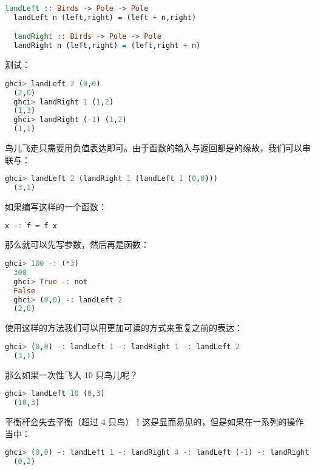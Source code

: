 \documentclass[./main.tex]{subfiles}
\begin{document}
\begin{lstlisting}[language=Haskell]
  landLeft :: Birds -> Pole -> Pole
  landLeft n (left,right) = (left + n,right)

  landRight :: Birds -> Pole -> Pole
  landRight n (left,right) = (left,right + n)
\end{lstlisting}

测试：

\begin{lstlisting}[language=Haskell]
  ghci> landLeft 2 (0,0)
  (2,0)
  ghci> landRight 1 (1,2)
  (1,3)
  ghci> landRight (-1) (1,2)
  (1,1)
\end{lstlisting}

鸟儿飞走只需要用负值表达即可。由于函数的输入与返回都是的缘故，我们可以串联与：

\begin{lstlisting}[language=Haskell]
  ghci> landLeft 2 (landRight 1 (landLeft 1 (0,0)))
  (3,1)
\end{lstlisting}

如果编写这样的一个函数：

\begin{lstlisting}[language=Haskell]
  x -: f = f x
\end{lstlisting}

那么就可以先写参数，然后再是函数：

\begin{lstlisting}[language=Haskell]
  ghci> 100 -: (*3)
  300
  ghci> True -: not
  False
  ghci> (0,0) -: landLeft 2
  (2,0)
\end{lstlisting}

使用这样的方法我们可以用更加可读的方式来重复之前的表达：

\begin{lstlisting}[language=Haskell]
  ghci> (0,0) -: landLeft 1 -: landRight 1 -: landLeft 2
  (3,1)
\end{lstlisting}

那么如果一次性飞入 10 只鸟儿呢？

\begin{lstlisting}[language=Haskell]
  ghci> landLeft 10 (0,3)
  (10,3)
\end{lstlisting}

平衡杆会失去平衡（超过 4 只鸟）！这是显而易见的，但是如果在一系列的操作当中：

\begin{lstlisting}[language=Haskell]
  ghci> (0,0) -: landLeft 1 -: landRight 4 -: landLeft (-1) -: landRight (-2)
  (0,2)
\end{lstlisting}
\end{document}
